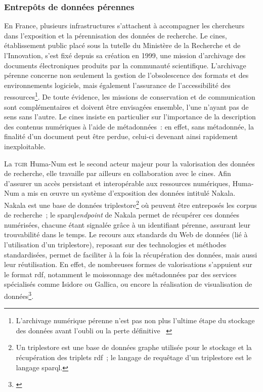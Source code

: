 \documentclass[a4paper,12pt,twoside]{book}
\newcommand{\eng}{\emph}
\newcommand{\bdd}{base de données\xspace}
\newcommand{\g}[1]{\og#1~\fg}
\newcommand{\rdf}{\gls{rdf}\xspace}
\newcommand{\cines}{\gls{cines}\xspace}
\newcommand{\sparql}{\gls{sparql}\xspace}
\begin{document}
			\subsubsection{Entrepôts de données pérennes}
En France, plusieurs infrastructures s'attachent à accompagner les chercheurs dans l'exposition et la pérennisation des données de recherche. Le \cines, établissement public placé sous la tutelle du Ministère de la Recherche et de l'Innovation, s'est fixé depuis sa création en 1999, une mission d'archivage des documents électroniques produits par la communauté scientifique. L'archivage pérenne concerne non seulement la gestion de l'obsolescence des formats et des environnements logiciels, mais également l'assurance de l'accessibilité des ressources\footnote{\g{L’archivage numérique pérenne n’est pas non plus l’ultime étape du stockage des données avant l’oubli ou la perte définitive} \cite{ConceptArchivageNumerique}}. De toute évidence, les missions de conservation et de communication sont complémentaires et doivent être envisagées ensemble, l'une n'ayant pas de sens sans l'autre. Le \cines insiste en particulier sur l'importance de la description des contenus numériques à l'aide de métadonnées~: en effet, sans métadonnée, la finalité d'un document peut être perdue, celui-ci devenant ainsi rapidement inexploitable.

La \textsc{tgir} Huma-Num est le second acteur majeur pour la valorisation des données de recherche, elle travaille par ailleurs en collaboration avec le \cines. Afin d'assurer un accès persistant et interopérable aux ressources numériques, Huma-Num a mis en œuvre un système d'exposition des données intitulé Nakala. Nakala est une \bdd triplestore\footnote{Un triplestore est une \bdd graphe utilisée pour le stockage et la récupération des triplets \rdf~; le langage de requêtage d'un triplestore est le langage \sparql.} où peuvent être entreposés les corpus de recherche~; le \sparql \eng{endpoint} de Nakala permet de récupérer ces données numérisées, chacune étant signalée grâce à un identifiant pérenne, assurant leur trouvabilité dans le temps. Le recours aux standards du Web de données (lié à l'utilisation d'un triplestore), reposant sur des technologies et méthodes standardisées, permet de faciliter à la fois la récupération des données, mais aussi leur réutilisation. En effet, de nombreuses formes de valorisations s'appuient sur le format \rdf, notamment le moissonnage des métadonnées par des services spécialisés comme Isidore ou Gallica, ou encore la réalisation de visualisation de données\footnote{\cite{NAKALAParHumaNuma}}.
\end{document}
